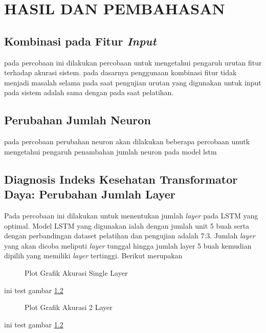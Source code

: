 \chapter{HASIL DAN PEMBAHASAN}
\label{BAB4:hasil}

\section{Kombinasi pada Fitur \textit{Input}}
pada percobaan ini dilakukan percobaan untuk mengetahui pengaruh urutan fitur terhadap akurasi sistem. pada dasarnya penggunaan kombinasi fitur tidak menjadi masalah selama pada saat pengujian urutan yang digunakan untuk input pada sistem adalah sama dengan pada saat pelatihan.
\section{Perubahan Jumlah Neuron}
pada percobaan perubahan neuron akan dilakukan beberapa percobaan unutk mengetahui pengaruh penambahan jumlah neuron pada model lstm
\section{Diagnosis Indeks Kesehatan Transformator Daya: Perubahan Jumlah Layer}
Pada percobaan ini dilakukan untuk menentukan jumlah \textit{layer} pada LSTM yang optimal. Model LSTM yang digunakan ialah dengan jumlah unit 5 buah serta dengan perbandingan dataset pelatihan dan pengujian adalah 7:3. Jumlah \textit{layer} yang akan dicoba meliputi \textit{layer} tunggal hingga jumlah layer 5 buah kemudian dipilih yang memiliki \textit{layer} tertinggi. Berikut merupakan 
%		

\begin{figure}[h]
	\centering
	
	\caption{Plot Grafik Akurasi Single Layer}
	\label{gambar:plot single layer}
\end{figure}
ini test gambar \ref{gambar:plot 2 layer}
\begin{figure}[h]
	\centering
	
	\caption{Plot Grafik Akurasi 2 Layer}
	\label{gambar:plot 2 layer}
\end{figure}
ini test gambar \ref{gambar:plot 2 layer}

%	
